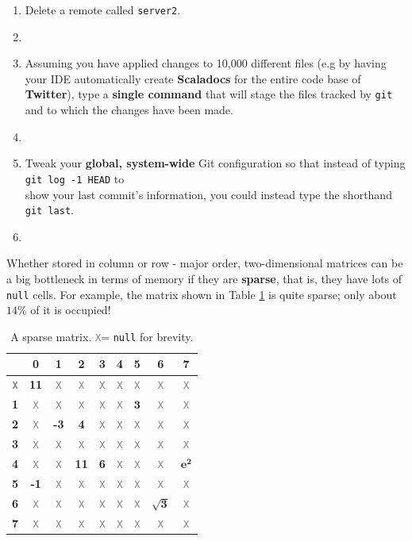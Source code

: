 \documentclass[letterpaper,12pt]{article}
\newcommand{\gitproblemline}{\myline{0.9\textwidth}}
\newcommand{\Xt}{\small \textcolor{gray}{\texttt{X}}}
\begin{document}
\begin{enumerate}[label=(\alph*)]
	\item Delete a remote called {\tt server2}.
		\item[] \gitproblemline
		\item Assuming you have applied changes to 10,000 different files (e.g by having your IDE automatically create \textbf{Scaladocs} for the entire code base of \textbf{Twitter}), type a \textbf{single command} that will stage  the files tracked by {\tt git} and to which the changes have been made.
		\item[] \gitproblemline
	\item Tweak your {\bf global, system-wide} Git configuration so that instead of typing {\tt git log -1 HEAD} to  \\ show your last commit's information, you could instead type the shorthand {\tt git last}.
		\item[] \gitproblemline
\end{enumerate}

\pagebreak


Whether stored in column or row - major order, two-dimensional matrices can be a big bottleneck in terms of memory if they are \textbf{sparse}, that is, they have lots of {\tt null} cells. For example, the matrix shown in Table \ref{tbl:sparseMat} is quite sparse; only about $14\%$ of it is occupied!

\begin{table}[H]
    \centering
	\begin{tabular}{c | c c c c c c c c} 
		\  & \textbf{0} & \textbf{1} & \textbf{2} & \textbf{3} & \textbf{4} & \textbf{5} & \textbf{6} & \textbf{7} \\ \hline 
		\textbf{\Xt} & \textbf{11} & \Xt & \Xt & \Xt & \Xt & \Xt & \Xt & \Xt \\
		\textbf{1} & \Xt & \Xt & \Xt & \Xt & \Xt & $\mathbf{3}$ & \Xt & \Xt \\
		\textbf{2} & \Xt & \textbf{-3} & \textbf{4} & \Xt & \Xt & \Xt & \Xt & \Xt \\
		\textbf{3} & \Xt & \Xt & \Xt & \Xt & \Xt & \Xt & \Xt & \Xt \\	
		\textbf{4} & \Xt & \Xt & \textbf{11} & \textbf{6} & \Xt & \Xt & \Xt & $\mathbf{e^2}$ \\
		\textbf{5} & \textbf{-1} & \Xt & \Xt & \Xt & \Xt & \Xt & \Xt & \Xt \\
		\textbf{6} & \Xt & \Xt & \Xt & \Xt & \Xt & \Xt & $\mathbf{\sqrt{3}}$ & \Xt \\
		\textbf{7} & \Xt & \Xt & \Xt & \Xt & \Xt & \Xt & \Xt & \Xt \\	
	\end{tabular}
	\caption{A sparse matrix.  \Xt = \texttt{null} for brevity.}
	\label{tbl:sparseMat}
\end{table}
\end{document}
